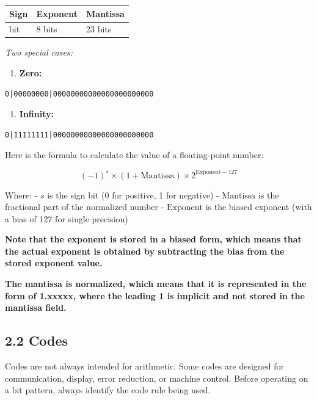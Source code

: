 \documentclass[11pt,a4paper]{article}
\providecommand{\tightlist}{\setlength{\itemsep}{1pt}\setlength{\parskip}{0pt}}
\begin{document}
\begin{longtable}[]{@{}lll@{}}
\toprule\noalign{}
Sign & Exponent & Mantissa \\
\midrule\noalign{}
\endhead
\bottomrule\noalign{}
\endlastfoot
1 bit & 8 bits & 23 bits \\
\end{longtable}

\emph{Two special cases:}

\begin{enumerate}
\def\labelenumi{\arabic{enumi}.}
\tightlist
\item
  \textbf{Zero:}
\end{enumerate}

\begin{verbatim}
0|00000000|00000000000000000000000
\end{verbatim}

\begin{enumerate}
\def\labelenumi{\arabic{enumi}.}
\setcounter{enumi}{1}
\tightlist
\item
  \textbf{Infinity:}
\end{enumerate}

\begin{verbatim}
0|11111111|00000000000000000000000
\end{verbatim}

Here is the formula to calculate the value of a floating-point number:

\[(-1)^s \times (1 + \text{Mantissa}) \times 2^{\text{Exponent} - 127}\]

Where: - \(s\) is the sign bit (0 for positive, 1 for negative) -
\(\text{Mantissa}\) is the fractional part of the normalized number -
\(\text{Exponent}\) is the biased exponent (with a bias of 127 for
single precision)

\textbf{Note that the exponent is stored in a biased form, which means
that the actual exponent is obtained by subtracting the bias from the
stored exponent value.}

\textbf{The mantissa is normalized, which means that it is represented
in the form of 1.xxxxx, where the leading 1 is implicit and not stored
in the mantissa field.}

\subsection{2.2 Codes}\label{codes}

Codes are not always intended for arithmetic. Some codes are designed
for communication, display, error reduction, or machine control. Before
operating on a bit pattern, always identify the code rule being used.
\end{document}
